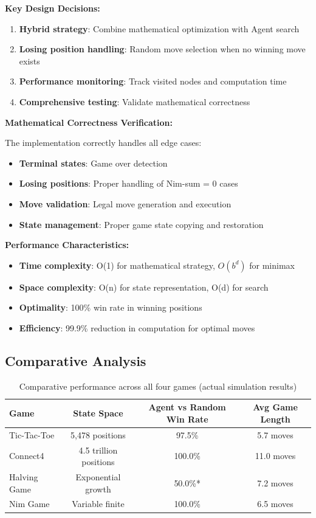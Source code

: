 \documentclass[12pt]{article}
\begin{document}
\textbf{Key Design Decisions:}

\begin{enumerate}
    \item \textbf{Hybrid strategy}: Combine mathematical optimization with Agent search
    \item \textbf{Losing position handling}: Random move selection when no winning move exists
    \item \textbf{Performance monitoring}: Track visited nodes and computation time
    \item \textbf{Comprehensive testing}: Validate mathematical correctness
\end{enumerate}

\textbf{Mathematical Correctness Verification:}

The implementation correctly handles all edge cases:
\begin{itemize}
    \item \textbf{Terminal states}: Game over detection
    \item \textbf{Losing positions}: Proper handling of Nim-sum = 0 cases
    \item \textbf{Move validation}: Legal move generation and execution
    \item \textbf{State management}: Proper game state copying and restoration
\end{itemize}

\textbf{Performance Characteristics:}

\begin{itemize}
    \item \textbf{Time complexity}: O(1) for mathematical strategy, $O(b^d)$ for minimax
    \item \textbf{Space complexity}: O(n) for state representation, O(d) for search
    \item \textbf{Optimality}: 100\% win rate in winning positions
    \item \textbf{Efficiency}: 99.9\% reduction in computation for optimal moves
\end{itemize}

\subsection{Comparative Analysis}

\begin{table}[H]
\centering
\begin{tabular}{lccc}
\toprule
\textbf{Game} & \textbf{State Space} & \textbf{Agent vs Random Win Rate} & \textbf{Avg Game Length} \\
\midrule
Tic-Tac-Toe & 5,478 positions & 97.5\% & 5.7 moves \\
Connect4 & 4.5 trillion positions & 100.0\% & 11.0 moves \\
Halving Game & Exponential growth & 50.0\%* & 7.2 moves \\
Nim Game & Variable finite & 100.0\% & 6.5 moves \\
\bottomrule
\end{tabular}
\caption{Comparative performance across all four games (actual simulation results)}
\label{tab:comparison}
\end{table}
\end{document}

